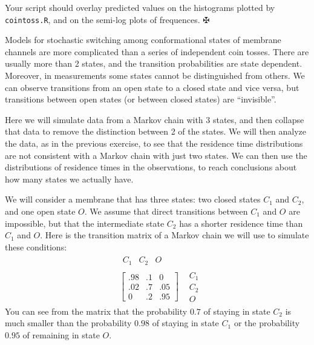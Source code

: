 \documentclass [11pt]{article}
\def\C{\mathbf{C}}
\newcounter{exercise}
\numberwithin{exercise}{section}
\begin{document}
Your script should overlay predicted values on the histograms plotted by \texttt{cointoss.R}, and on the
semi-log plots of frequences. $\maltese$ 

Models for stochastic switching among conformational states of membrane channels are more complicated than 
a series of independent coin tosses. There are usually more than 2 states, and the transition probabilities are state dependent. Moreover, in measurements some states cannot be distinguished 
from others. We can observe transitions from an open state to a closed
state and vice versa, but transitions between open states (or between closed states)
are ``invisible''. 

Here we will simulate data from a Markov chain with 3 states, and then collapse that data to remove the distinction 
between 2 of the states. We will then analyze the data, as in the previous exercise, 
to see that the residence time distributions are not consistent with a Markov chain with just two states. 
We can then use the distributions of residence times in the observations, 
to reach conclusions about how many states we actually have.

We will consider a membrane that has three states: two closed states $C_1$ and $C_2$, and one open state $O$. 
We assume that direct transitions between $C_1$ and $O$ are impossible, but that the intermediate state
$C_2$ has a shorter residence time than $C_1$ and $O$. Here is the transition
matrix of a Markov chain we will use to simulate these conditions:
\begin{eqnarray*}
&\begin{matrix}C_1&C_2&O\end{matrix}&\\
&\displaystyle{\begin{bmatrix}.98&.1&0\\
                              .02&.7&.05\\
                               0 &.2&.95\end{bmatrix}}
&\begin{matrix}C_1\\C_2\\O\end{matrix}
\end{eqnarray*}
You can see from the matrix that the probability $0.7$ of staying in
state $C_2$ is much smaller than the probability $0.98$ of staying in
state $C_1$ or the probability $0.95$ of remaining in state $O$.
\end{document}
